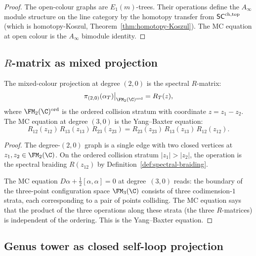 \begin{proof}
The open-colour graphs are $E_1(m)$-trees. Their operations
define the $A_\infty$ module structure on the line category by
the homotopy transfer from $\mathsf{SC}^{\mathrm{ch,top}}$ (which is homotopy-Koszul,
Theorem~\ref{thm:homotopy-Koszul}). The MC equation at open
colour is the $A_\infty$ bimodule identity.
\end{proof}


\subsection{\texorpdfstring{$R$}{R}-matrix as mixed projection}

\begin{theorem}
The mixed-colour projection at degree $(2,0)$ is the spectral
$R$-matrix:
\begin{equation}%
\pi_{(2,0)}(\alpha_T)\big|_{\FM_2(\C)^{\mathrm{ord}}}
= R_T(z),
\end{equation}
where $\FM_2(\C)^{\mathrm{ord}}$ is the ordered collision stratum
with coordinate $z=z_1-z_2$. The MC equation at degree $(3,0)$ is
the Yang--Baxter equation:
\begin{equation}%
R_{12}(z_{12})\,R_{13}(z_{13})\,R_{23}(z_{23})
= R_{23}(z_{23})\,R_{13}(z_{13})\,R_{12}(z_{12}).
\end{equation}
\end{theorem}

\begin{proof}
The degree-$(2,0)$ graph is a single edge with two closed vertices
at $z_1,z_2\in\FM_2(\C)$. On the ordered collision stratum
$|z_1|>|z_2|$, the operation is the spectral braiding
$R(z_{12})$ by Definition~\ref{def:spectral-braiding}.

The MC equation $D\alpha+\tfrac{1}{2}[\alpha,\alpha]=0$ at
degree~$(3,0)$ reads: the boundary of the three-point
configuration space $\FM_3(\C)$ consists of three codimension-$1$
strata, each corresponding to a pair of points colliding. The
MC equation says that the product of the three operations along
these strata (the three $R$-matrices) is independent of the
ordering. This is the Yang--Baxter equation.
\end{proof}


\subsection{Genus tower as closed self-loop projection}

